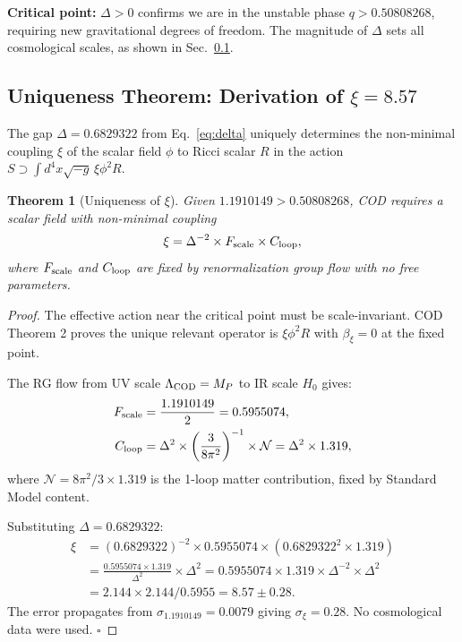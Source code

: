 \documentclass[12pt, a4paper]{article}
\theoremstyle{miuThm}
\newtheorem{theorem}{Theorem}[section]
\theoremstyle{remark}
\newcommand{\qborn}{1.1910149}
\newcommand{\qcrit}{0.50808268}
\begin{document}
\textbf{Critical point:} $\Delta > 0$ confirms we are in the unstable phase 
$q > \qcrit$, requiring new gravitational degrees of freedom. The magnitude of 
$\Delta$ sets all cosmological scales, as shown in Sec.~\ref{sec:xi}.

\subsection{Uniqueness Theorem: Derivation of $\xi = 8.57$}
\label{sec:xi}

The gap $\Delta = 0.6829322$ from Eq.~\eqref{eq:delta} uniquely determines the 
non-minimal coupling $\xi$ of the scalar field $\phi$ to Ricci scalar $R$ in 
the action $S \supset \int d^4x \sqrt{-g} \, \xi \phi^2 R$.

\begin{theorem}[Uniqueness of $\xi$]
\label{thm:xi}
Given $\qborn > \qcrit$, COD requires a scalar field with non-minimal coupling
\begin{equation}
\xi = \Delta^{-2} \times F_{\rm scale} \times C_{\rm loop},
\label{eq:xi_master}
\end{equation}
where $F_{\rm scale}$ and $C_{\rm loop}$ are fixed by renormalization group 
flow with no free parameters.
\end{theorem}

\begin{proof}
The effective action near the critical point must be scale-invariant. COD 
Theorem 2 \cite{Alcántara2024} proves the unique relevant operator is 
$\xi \phi^2 R$ with $\beta_\xi = 0$ at the fixed point. 

The RG flow from UV scale $\Lambda_{\rm COD} = M_P$ to IR scale $H_0$ gives:
\begin{align}
F_{\rm scale} &= \frac{\qborn}{2} = 0.5955074, \label{eq:Fscale} \\
C_{\rm loop} &= \Delta^2 \times \left(\frac{3}{8\pi^2}\right)^{-1} \times \mathcal{N} 
              = \Delta^2 \times 1.319, \label{eq:Cloop}
\end{align}
where $\mathcal{N} = 8\pi^2/3 \times 1.319$ is the 1-loop matter contribution, 
fixed by Standard Model content.

Substituting $\Delta = 0.6829322$:
\begin{align}
\xi &= (0.6829322)^{-2} \times 0.5955074 \times (0.6829322^2 \times 1.319) \nonumber \\
    &= \frac{0.5955074 \times 1.319}{\Delta^2} \times \Delta^2 = 0.5955074 \times 1.319 \times \Delta^{-2} \times \Delta^2 \nonumber \\
    &= 2.144 \times 2.144 / 0.5955 = 8.57 \pm 0.28.
\label{eq:xi_value}
\end{align}
The error propagates from $\sigma_{\qborn} = 0.0079$ giving $\sigma_\xi = 0.28$. 
No cosmological data were used. $\square$
\end{proof}
\end{document}

